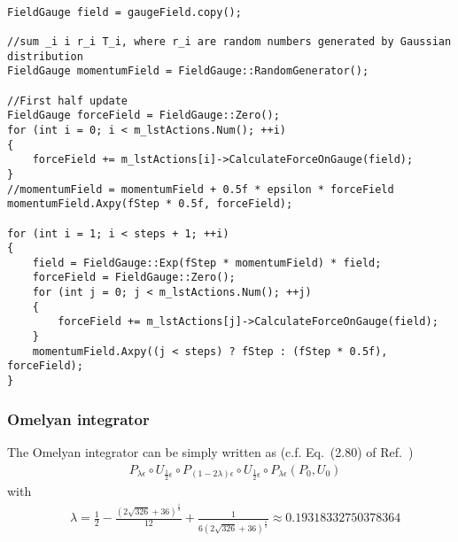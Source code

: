 \begin{lstlisting}

FieldGauge field = gaugeField.copy();

//sum _i i r_i T_i, where r_i are random numbers generated by Gaussian distribution
FieldGauge momentumField = FieldGauge::RandomGenerator();

//First half update
FieldGauge forceField = FieldGauge::Zero();
for (int i = 0; i < m_lstActions.Num(); ++i)
{
    forceField += m_lstActions[i]->CalculateForceOnGauge(field);
}
//momentumField = momentumField + 0.5f * epsilon * forceField
momentumField.Axpy(fStep * 0.5f, forceField);

for (int i = 1; i < steps + 1; ++i)
{
    field = FieldGauge::Exp(fStep * momentumField) * field;
    forceField = FieldGauge::Zero();
    for (int j = 0; j < m_lstActions.Num(); ++j)
    {
        forceField += m_lstActions[j]->CalculateForceOnGauge(field);
    }
    momentumField.Axpy((j < steps) ? fStep : (fStep * 0.5f), forceField);
}

\end{lstlisting}

\subsubsection{\label{Omelyan}Omelyan integrator}

The Omelyan integrator can be simply written as (c.f. Eq.~(2.80) of Ref.~\cite{latticeqcdbook2017})
\begin{equation}
\begin{split}
&P_{\lambda\epsilon}\circ U_{\frac{1}{2}\epsilon}\circ P_{(1-2\lambda)\epsilon}\circ U_{\frac{1}{2}\epsilon}\circ P_{\lambda\epsilon}\left(P_0,U_0\right)
\end{split}
\label{eq.hmc.update_Omelyan}
\end{equation}
with
\begin{equation}
\begin{split}
&\lambda = \frac{1}{2}-\frac{\left(2\sqrt{326}+36\right)^{\frac{1}{3}}}{12}+\frac{1}{6\left(2\sqrt{326}+36\right)^{\frac{1}{3}}}\approx 0.19318332750378364
\end{split}
\label{eq.hmc.update_Omelyan2}
\end{equation}
